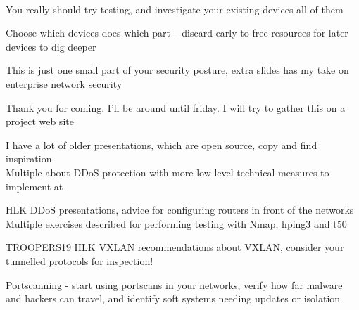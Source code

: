 \documentclass[Screen16to9,17pt]{foils}
\begin{document}

~
\begin{list2}
\item You really should try testing, and investigate your existing devices
all of them
\item Choose which devices does which part -- discard early to free resources for later devices to dig deeper
\item This is just one small part of your security posture, extra slides has my take on enterprise network security
\end{list2}

\myquestionspage


Thank you for coming. I'll be around until friday. I will try to gather this on a project web site 




I have a lot of older presentations, which are open source, copy and find inspiration\\
Multiple about DDoS protection with more low level technical measures to implement at\\
{\footnotesize {}}

\begin{list2}
\item HLK DDoS presentations, advice for configuring routers in front of the networks\\
Multiple exercises described for performing testing with Nmap, hping3 and t50
\item TROOPERS19 HLK VXLAN recommendations about VXLAN, consider your tunnelled protocols for inspection!
\item Portscanning - start using portscans in your networks, verify how far malware and hackers can travel, and identify soft systems needing updates or isolation
\end{list2}

\end{document}

